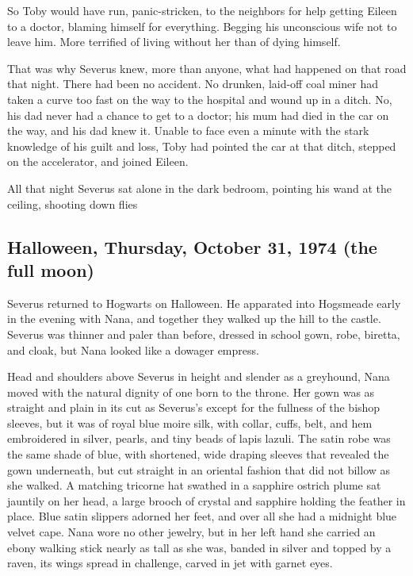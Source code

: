 So Toby would have run, panic-stricken, to the neighbors for help getting Eileen to a doctor, blaming himself for everything. Begging his unconscious wife not to leave him. More terrified of living without her than of dying himself.

That was why Severus knew, more than anyone, what had happened on that road that night. There had been no accident. No drunken, laid-off coal miner had taken a curve too fast on the way to the hospital and wound up in a ditch. No, his dad never had a chance to get to a doctor; his mum had died in the car on the way, and his dad knew it. Unable to face even a minute with the stark knowledge of his guilt and loss, Toby had pointed the car at that ditch, stepped on the accelerator, and joined Eileen.

All that night Severus sat alone in the dark bedroom, pointing his wand at the ceiling, shooting down flies{\el}

\subsection{Halloween, Thursday, October 31, 1974 (the full moon)}

Severus returned to Hogwarts on Halloween. He apparated into Hogsmeade early in the evening with Nana, and together they walked up the hill to the castle. Severus was thinner and paler than before, dressed in school gown, robe, biretta, and cloak, but Nana looked like a dowager empress.

Head and shoulders above Severus in height and slender as a greyhound, Nana moved with the natural dignity of one born to the throne. Her gown was as straight and plain in its cut as Severus's except for the fullness of the bishop sleeves, but it was of royal blue moire silk, with collar, cuffs, belt, and hem embroidered in silver, pearls, and tiny beads of lapis lazuli. The satin robe was the same shade of blue, with shortened, wide draping sleeves that revealed the gown underneath, but cut straight in an oriental fashion that did not billow as she walked. A matching tricorne hat swathed in a sapphire ostrich plume sat jauntily on her head, a large brooch of crystal and sapphire holding the feather in place. Blue satin slippers adorned her feet, and over all she had a midnight blue velvet cape. Nana wore no other jewelry, but in her left hand she carried an ebony walking stick nearly as tall as she was, banded in silver and topped by a raven, its wings spread in challenge, carved in jet with garnet eyes.

